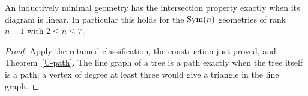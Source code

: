 \begin{corollary}
An inductively minimal geometry has the intersection property exactly
when its diagram is linear. In particular this holds for the
$\operatorname{Sym}(n)$ geometries of rank $n-1$ with $2\leq n\leq7$.
\end{corollary}
\begin{proof}
Apply the retained classification, the construction just proved, and
Theorem~\ref{U-path}. The line graph of a tree is a path exactly when the
tree itself is a path: a vertex of degree at least three would give a
triangle in the line graph.
\end{proof}

